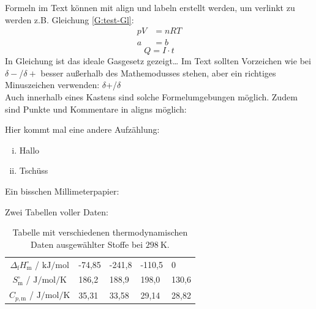 \documentclass[./main.tex]{subfiles}
\begin{document}
Formeln im Text k\"onnen mit align und labeln erstellt werden, um verlinkt zu werden z.B. Gleichung \ref{G:test-Gl}:
\begin{align}
    pV &= nRT \label{G:test-Gl}\\
    a &= b
\end{align}
\begin{equation*}
    Q = I \cdot t
\end{equation*}
In Gleichung ist das ideale Gasgesetz gezeigt\ldots 
Im Text sollten Vorzeichen wie bei $\delta-$/$\delta+$ besser au\ss{}erhalb des Mathemodusses stehen, aber ein richtiges Minuszeichen verwenden: $\delta$+/$\delta$\textminus{}\\
Auch innerhalb eines Kastens sind solche Formelumgebungen m\"oglich. Zudem sind Punkte und Kommentare in aligns m\"oglich:\par
{}
Hier kommt mal eine andere Aufz\"ahlung:
\begin{enumerate}[(i)]
    \item Hallo
    \item Tsch\"uss
\end{enumerate}

Ein bisschen Millimeterpapier:\\


Zwei Tabellen voller Daten:
\begin{table}[H]
    \caption{Tabelle mit verschiedenen thermodynamischen Daten ausgew\"ahlter Stoffe bei $\SI{298}{\kelvin}$.}
    \label{tab: 2025-10-3_therm. Daten}
    \centering
    \begin{tabular}{|c|C{1.5cm}|C{1.5cm}|C{1.5cm}|C{1.5cm}|}
    \hline
        &  &  &  & \\\hline
        $\Delta_\mathrm{f}H^{\circ}_\mathrm{m}$ / $\si{\kilo\joule\per\mole}$ & -74,85 & -241,8 & -110,5 & 0\\\hline
        $S^{\circ}_\mathrm{m}$ / $\si{\joule\per\mole\per\kelvin}$ & 186,2 & 188,9 & 198,0 & 130,6\\\hline
        $C_{p, \mathrm{m}}$ / $\si{\joule\per\mole\per\kelvin}$ & 35,31 & 33,58 & 29,14 & 28,82\\\hline
    \end{tabular}
\end{table}
\end{document}
